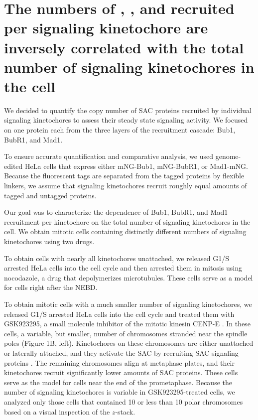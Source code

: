 \section{The numbers of , , and  recruited per signaling kinetochore are inversely correlated with the total number of signaling kinetochores in the cell}

We decided to quantify the copy number of SAC proteins recruited by individual signaling kinetochores to assess their steady state signaling activity. We focused on one protein each from the three layers of the recruitment cascade: Bub1, BubR1, and Mad1.

To ensure accurate quantification and comparative analysis, we used genome-edited HeLa cells that express either mNG-Bub1, mNG-BubR1, or Mad1-mNG. Because the fluorescent tags are separated from the tagged proteins by flexible linkers, we assume that signaling kinetochores recruit roughly equal amounts of tagged and untagged proteins.

Our goal was to characterize the dependence of Bub1, BubR1, and Mad1 recruitment per kinetochore on the total number of signaling kinetochores in the cell. We obtain mitotic cells containing distinctly different numbers of signaling kinetochores using two drugs.

To obtain cells with nearly all kinetochores unattached, we released G1/S arrested HeLa cells into the cell cycle and then arrested them in mitosis using nocodazole, a drug that depolymerizes microtubules. These cells serve as a model for cells right after the NEBD.

To obtain mitotic cells with a much smaller number of signaling kinetochores, we released G1/S arrested HeLa cells into the cell cycle and treated them with GSK923295, a small molecule inhibitor of the mitotic kinesin CENP-E \cite{GSK923295}. In these cells, a variable, but smaller, number of chromosomes stranded near the spindle poles (Figure 1B, left). Kinetochores on these chromosomes are either unattached or laterally attached, and they activate the SAC by recruiting SAC signaling proteins \cite{GSK923295LateralAttachmentEM, GSK923295MonastrolCotreatment}. The remaining chromosomes align at metaphase plates, and their kinetochores recruit significantly lower amounts of SAC proteins. These cells serve as the model for cells near the end of the prometaphase. Because the number of signaling kinetochores is variable in GSK923295-treated cells, we analyzed only those cells that contained 10 or less than 10 polar chromosomes based on a visual inspection of the $z$-stack.

